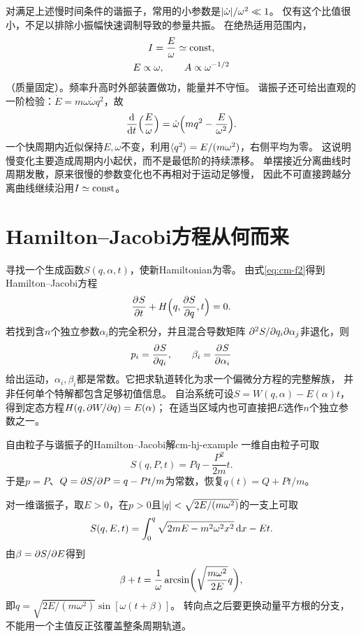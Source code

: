 对满足上述慢时间条件的谐振子，常用的小参数是$\lvert\dot\omega\rvert/\omega^2 \ll 1$。
仅有这个比值很小，不足以排除小振幅快速调制导致的参量共振。
在绝热适用范围内，
\begin{subequations}
 \begin{gather}
  I = \frac E\omega \simeq \mathrm{const},\\
  E \propto \omega,\qquad A \propto \omega^{-1/2}
 \end{gather}
\end{subequations}
（质量固定）。频率升高时外部装置做功，能量并不守恒。
谐振子还可给出直观的一阶检验：$\dot E = m\omega\dot\omega q^2$，故
\begin{equation}
 \frac{\mathop{}\!\mathrm{d}^{}}{\mathrm{d}{t}^{}}\Bigl(\frac E\omega\Bigr)
 = \dot\omega\Bigl(mq^2 - \frac E{\omega^2}\Bigr).
\end{equation}
一个快周期内近似保持$E,\omega$不变，利用$\langle q^2\rangle = E/(m\omega^2)$，右侧平均为零。
这说明慢变化主要造成周期内小起伏，而不是最低阶的持续漂移。
单摆接近分离曲线时周期发散，原来很慢的参数变化也不再相对于运动足够慢，
因此不可直接跨越分离曲线继续沿用$I \simeq \mathrm{const}$。

\section{Hamilton--Jacobi方程从何而来}
寻找一个生成函数$S(q,\alpha,t)$，使新Hamiltonian为零。
由式\eqref{eq:cm-f2}得到Hamilton--Jacobi方程
\begin{equation}
 \frac{\partial^{}S}{\partial{t}^{}} + H\Bigl(q,\frac{\partial S}{\partial q},t\Bigr) = 0.
 \label{eq:cm-hj}
\end{equation}
若找到含$n$个独立参数$\alpha_i$的完全积分，并且混合导数矩阵
$\partial^2 S/\partial q_i\partial\alpha_j$非退化，则
\begin{equation}
 p_i = \frac{\partial^{}S}{\partial{q_i}^{}},\qquad \beta_i = \frac{\partial^{}S}{\partial{\alpha_i}^{}}
\end{equation}
给出运动，$\alpha_i,\beta_i$都是常数。它把求轨道转化为求一个偏微分方程的完整解族，
并非任何单个特解都包含足够初值信息。
自治系统可设$S = W(q,\alpha) - E(\alpha)t$，得到定态方程$H(q,\partial W/\partial q) = E(\alpha)$；
在适当区域内也可直接把$E$选作$n$个独立参数之一。

\begin{example}{自由粒子与谐振子的Hamilton--Jacobi解}{cm-hj-example}
一维自由粒子可取
\begin{equation}
 S(q,P,t) = Pq - \frac{P^2}{2m}t.
\end{equation}
于是$p = P$、$Q = \partial S/\partial P = q - Pt/m$为常数，恢复$q(t) = Q + Pt/m$。

对一维谐振子，取$E > 0$，在$p > 0$且$\lvert q\rvert < \sqrt{2E/(m\omega^2)}$的一支上可取
\begin{equation}
 S(q,E,t) = \int_0^q\sqrt{2mE - m^2\omega^2x^2}\mathop{}\!\mathrm{d} x - Et.
\end{equation}
由$\beta = \partial S/\partial E$得到
\[
 \beta + t = \frac1\omega\arcsin\biggl(\sqrt{\frac{m\omega^2}{2E}}q\biggr),
\]
即$q = \sqrt{2E/(m\omega^2)}\sin[\omega(t + \beta)]$。
转向点之后要更换动量平方根的分支，不能用一个主值反正弦覆盖整条周期轨道。
\end{example}


